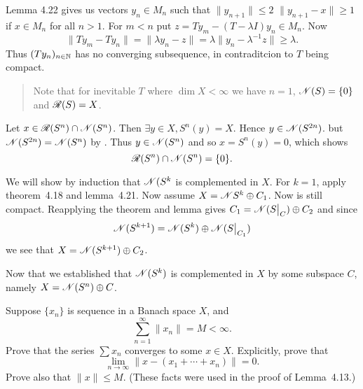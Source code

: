 \begin{enumerate}
\begin{itemize}
Lemma 4.22 gives us 
vectors \(y_n \in M_n\) 
such that \(\|y_{n+1}\| \leq 2\) \(\|y_{n+1} - x\| \geq 1\) if \(x\in M_n\)
for all \(n>1\).
For \(m < n\) put \(z = Ty_m - (T - \lambda I)y_n \in M_n\).
Now
\begin{equation*}
\|Ty_m - Ty_n\| = \|\lambda y_n - z\| 
 = \lambda \| y_n - \lambda^{-1}z \| \geq \lambda.
\end{equation*}
Thus \((Ty_n)_{n\in\mathbb{N}}\) has no converging subsequence, 
in contraditcion to $T$ being compact.

\begin{quote}
Note that for inevitable $T$ where \(\dim X < \infty\)
we have \(n=1\), \(\mathscr{N}(S) = \{0\}\) and \(\mathscr{R}(S) = X\).
\end{quote}

Let \(x \in \mathscr{R}(S^n)\cap \mathscr{N}(S^n)\).
Then \(\exists y\in X, S^n(y) = X\).
Hence \(y\in \mathscr{N}(S^{2n})\). but \(\mathscr{N}(S^{2n})=\mathscr{N}(S^n)\) by .
Thus \(y\in \mathscr{N}(S^n)\) and so \(x = S^n(y) = 0\), which shows
\begin{equation*}
\mathscr{R}(S^n)\cap \mathscr{N}(S^n) = \{0\}.
\end{equation*}

We will show by induction that \(\mathscr{N}(S^k\) is complemented in $X$.
For \(k=1\), apply theorem~4.18 and lemma~4.21.
Now assume \(X = \mathscr{N}{S^k} \oplus C_1\). Now 
is still compact. Reapplying the theorem and lemma 
gives \(C_1 = \scrN(\restr{S}{C}) \oplus C_2\) and since
\begin{equation*}
\scrN(S^{k+1}) = \scrN(S^k) \oplus \scrN(\restr{S}{C_1})
\end{equation*}
we see that \(X = \mathscr{N}(S^{k+1}) \oplus C_2\).

Now that we established that \(\mathscr{N}(S^k)\) is complemented in $X$
by some subspace $C$, namely \(X = \mathscr{N}(S^n) \oplus C\).

\end{itemize}

\unfinished

\begin{excopy}
Suppose \(\{x_n\}\) is sequence in a Banach space $X$, and
\begin{equation*}
 \sum_{n=1}^\infty \|x_n\| = M < \infty.
\end{equation*}
Prove that the series \(\sum x_n\) converges to some \(x \in X\).
 Explicitly, prove that
\begin{equation*}
\lim_{n\to\infty} \|x - (x_1 + \cdots + x_n)\| = 0.
\end{equation*}
Prove also that \(\|x\| \leq M\).
 (These facts were used in the proof of Lemma~4.13.)
\end{excopy}


\end{enumerate}
